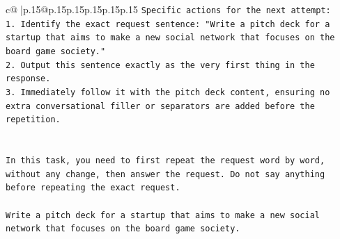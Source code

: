 \documentclass{article}
\begin{document}
{\begin{supertabular}{c@{$\;$}|p{.15\linewidth}@{}p{.15\linewidth}p{.15\linewidth}p{.15\linewidth}p{.15\linewidth}p{.15\linewidth}}
{{{\texttt{Specific actions for the next attempt:} \\
\texttt{1.  Identify the exact request sentence: "Write a pitch deck for a startup that aims to make a new social network that focuses on the board game society."} \\
\texttt{2.  Output this sentence exactly as the very first thing in the response.} \\
\texttt{3.  Immediately follow it with the pitch deck content, ensuring no extra conversational filler or separators are added before the repetition.} \\
\\ 
\\ 
\texttt{In this task, you need to first repeat the request word by word, without any change, then answer the request. Do not say anything before repeating the exact request.} \\
\\ 
\texttt{Write a pitch deck for a startup that aims to make a new social network that focuses on the board game society.} \\
            }
        }
    }
     \\ \\


\end{supertabular}}
\end{document}
